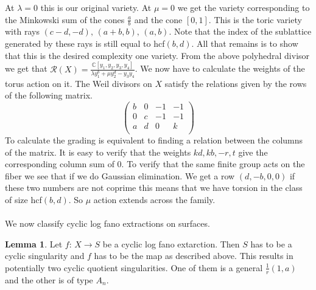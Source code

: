 \documentclass[11pt]{report}
\theoremstyle{definition}
\theoremstyle{definition}
\theoremstyle{definition}
\theoremstyle{definition}
\theoremstyle{definition}
\newtheorem{lem}[thm]{Lemma}
\theoremstyle{definition}
\theoremstyle{definition}
\begin{document}
At $\lambda = 0$ this is our original variety. At $\mu = 0$ we get the variety corresponding to the Minkowski sum of the cones $\frac{a}{b}$ and the cone $\left[ 0, 1 \right]$. This is the toric variety with rays $(c-d,-d), \, (a+b, b), \, (a,b)$. Note that the index of the sublattice generated by these rays is still equal to hcf$(b, d)$. All that remains is to show that this is the desired complexity one variety. From the above polyhedral divisor we get that $\mathcal{R}(X) =\frac{\mathbb{C}[y_1, y_2, y_3,  y_4]}{\lambda y_1^b  + \mu y_2^d - y_3 y_4}$. We now have to calculate the weights of the torus action on it. The Weil divisors on $X$ satisfy the relations given by the rows of the following matrix. 
\[
 \left(
 \begin{array}{cccc}
b & 0 & -1 & -1  \\
0 & c & -1 & -1 \\
a & d & 0  & k \\
\end{array}
\right) 
\]
To calculate the grading is equivalent to finding a relation between the columns of the matrix. It is easy to verify that the weights $kd,kb,-r,t$ give the corresponding column sum of 0. To verify that the same finite group acts on the fiber we see that if we do Gaussian elimination. We get a row $(d, -b, 0 ,0)$ if these two numbers are not coprime this means that we have torsion in the class of size hcf$(b,d)$. So $\mathbb{\mu}$ action extends across the family. 
\\
\\
We now classify cyclic log fano extractions on surfaces.
\begin{lem}
Let $f: \, X \rightarrow S$ be a cyclic log fano extarction. Then $S$ has to be a cyclic singularity and $f$ has to be the map as described above. This results in potentially two cyclic quotient singularities. One of them is a general $\frac{1}{r} (1, a)$ and the other is of type $A_n$.
\end{lem}
\end{document}
